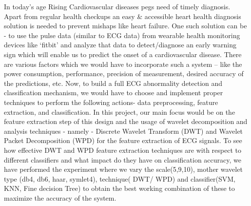 \documentclass[10pt,twocolumn,letterpaper]{article}
\begin{document}
In today’s age Rising Cardiovascular diseases pegs need of timely diagnosis. Apart from regular health checkups an easy & accessible heart health diagnosis solution is needed to prevent mishaps like heart failure. One such solution can be - to use the pulse data (similar to ECG data) from wearable health monitoring devices like ‘fitbit’ and analyze that data to detect/diagnose an early warning sign which will enable us to predict the onset of a cardiovascular disease. There are various factors which we would have to incorporate such a system – like the power consumption, performance, precision of measurement, desired accuracy of the predictions, etc.
Now, to build a full ECG abnormality detection and classification mechanism, we would have to choose and implement proper techniques to perform the following actions- data preprocessing, feature extraction, and classification. In this project, our main focus would be on the feature extraction step of this design and the usage of wavelet decomposition and analysis techniques - namely - Discrete Wavelet Transform (DWT) and Wavelet Packet Decomposition (WPD) for the feature extraction of ECG signals.
To see how effective DWT and WPD feature extraction techniques are with respect to different classifiers and what impact do they have on classification accuracy, we have performed the experiment where we vary the scale(5,9,10), mother wavelet type (db4, db6, haar, symlet4), technique( DWT/ WPD) and classifier(SVM, KNN, Fine decision Tree)  to obtain the best working combination of these to maximize the accuracy of the system.

\end{document}
